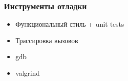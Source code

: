 \begin{frame}
  \frametitle{Инструменты отладки}
  \begin{itemize}
   \item Функциональный стиль + unit tests
   \item Трассировка вызовов
   \item gdb
   \item valgrind
  \end{itemize}
\end{frame}
